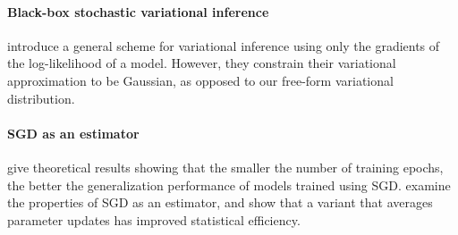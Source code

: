 \documentclass[]{article}
\begin{document}
\paragraph{Black-box stochastic variational inference}
\citet{alp2014blackbox} introduce a general scheme for variational inference using only the gradients of the log-likelihood of a model.
However, they constrain their variational approximation to be Gaussian, as opposed to our free-form variational distribution.





\paragraph{SGD as an estimator}
\citet{hardt2015train} give theoretical results showing that the smaller the number of training epochs, the better the generalization performance of models trained using SGD.
\citet{Dustin15} examine the properties of SGD as an estimator, and show that a variant that averages parameter updates has improved statistical efficiency.
\end{document}
